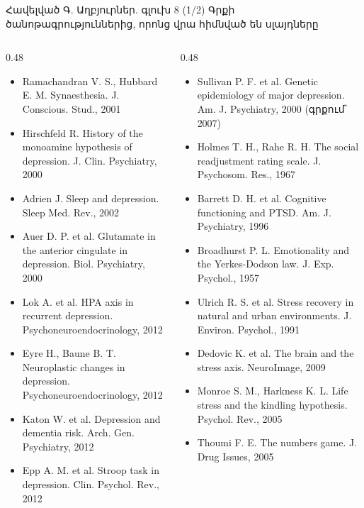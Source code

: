 \begin{frame}{Հավելված Գ. Աղբյուրներ. գլուխ 8 (1/2)}
  \scriptsize
  Գրքի ծանոթագրություններից, որոնց վրա հիմնված են սլայդները\par\smallskip
  \begin{columns}[T]
    \begin{column}{0.48\textwidth}
      \begin{itemize}\setlength{\itemsep}{0.3mm}
        \item Ramachandran V. S., Hubbard E. M. Synaesthesia. J. Conscious. Stud., 2001
        \item Hirschfeld R. History of the monoamine hypothesis of depression. J. Clin. Psychiatry, 2000
        \item Adrien J. Sleep and depression. Sleep Med. Rev., 2002
        \item Auer D. P. et al. Glutamate in the anterior cingulate in depression. Biol. Psychiatry, 2000
        \item Lok A. et al. HPA axis in recurrent depression. Psychoneuroendocrinology, 2012
        \item Eyre H., Baune B. T. Neuroplastic changes in depression. Psychoneuroendocrinology, 2012
        \item Katon W. et al. Depression and dementia risk. Arch. Gen. Psychiatry, 2012
        \item Epp A. M. et al. Stroop task in depression. Clin. Psychol. Rev., 2012
      \end{itemize}
    \end{column}
    \begin{column}{0.48\textwidth}
      \begin{itemize}\setlength{\itemsep}{0.3mm}
        \item Sullivan P. F. et al. Genetic epidemiology of major depression. Am. J. Psychiatry, 2000 (գրքում՝ 2007)
        \item Holmes T. H., Rahe R. H. The social readjustment rating scale. J. Psychosom. Res., 1967
        \item Barrett D. H. et al. Cognitive functioning and PTSD. Am. J. Psychiatry, 1996
        \item Broadhurst P. L. Emotionality and the Yerkes-Dodson law. J. Exp. Psychol., 1957
        \item Ulrich R. S. et al. Stress recovery in natural and urban environments. J. Environ. Psychol., 1991
        \item Dedovic K. et al. The brain and the stress axis. NeuroImage, 2009
        \item Monroe S. M., Harkness K. L. Life stress and the kindling hypothesis. Psychol. Rev., 2005
        \item Thoumi F. E. The numbers game. J. Drug Issues, 2005
      \end{itemize}
    \end{column}
  \end{columns}
\end{frame}

